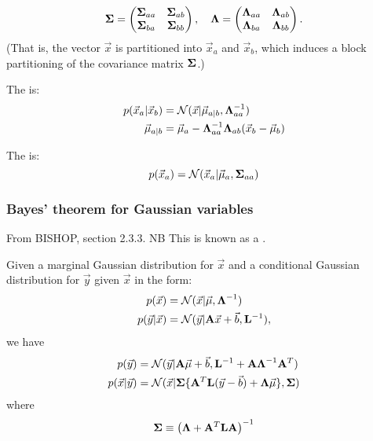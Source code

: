 \documentclass[11pt]{article}
\begin{document}
\begin{appendices}
\begin{equation}
  \boldsymbol{\Sigma} =
  \left(
    \begin{matrix}
      \boldsymbol{\Sigma}_{aa} & \boldsymbol{\Sigma}_{ab} \\
      \boldsymbol{\Sigma}_{ba} & \boldsymbol{\Sigma}_{bb}
    \end{matrix}
  \right)
  , \quad
  \boldsymbol{\Lambda} =
  \left(
    \begin{matrix}
      \boldsymbol{\Lambda}_{aa} & \boldsymbol{\Lambda}_{ab} \\
      \boldsymbol{\Lambda}_{ba} & \boldsymbol{\Lambda}_{bb}
    \end{matrix}
  \right).
\end{equation}
(That is, the vector $\vec{x}$ is partitioned into $\vec{x}_a$ and $\vec{x}_b$, which
induces a block partitioning of the covariance matrix $\boldsymbol{\Sigma}$.)

The  is:
\begin{align}
  p(\vec{x}_a | \vec{x}_b) &= \mathcal{N}(\vec{x} | \vec{\mu}_{a | b},
                              \boldsymbol{\Lambda}_{aa}^{-1}) \\ 
  \vec{\mu}_{a | b}        &= \vec{\mu}_a - \boldsymbol{\Lambda}_{aa}^{-1} \boldsymbol{\Lambda}_{ab}
                              (\vec{x}_b - \vec{\mu}_b) 
\end{align}

The  is:
\begin{equation}
  p(\vec{x}_a) = \mathcal{N}(\vec{x}_a | \vec{\mu}_a, \boldsymbol{\Sigma}_{aa})
\end{equation}

\subsubsection{Bayes' theorem for Gaussian variables}
From BISHOP, section 2.3.3. NB This is known as a .

Given a marginal Gaussian distribution for $\vec{x}$ and a conditional Gaussian
distribution for $\vec{y}$ given $\vec{x}$ in the form:
\begin{align}
  p(\vec{x})         &= \mathcal{N}(\vec{x} | \vec{\mu}, \boldsymbol{\Lambda}^{-1}) \\
  p(\vec{y}|\vec{x}) &= \mathcal{N}(\vec{y} | \mathbf{A} \vec{x} + \vec{b}, \mathbf{L}^{-1}),
\end{align}
we have
\begin{align}
  p(\vec{y})         &= \mathcal{N} (\vec{y} |\mathbf{A} \vec{\mu} + \vec{b}, \mathbf{L}^{-1}
                        + \mathbf{A} \boldsymbol{\Lambda}^{-1} \mathbf{A}^T ) \\
  p(\vec{x}|\vec{y}) &= \mathcal{N} ( \vec{x} | \boldsymbol{\Sigma} \{ \mathbf{A}^T \mathbf{L}
                        (\vec{y} - \vec{b}) + \boldsymbol{\Lambda} \vec{\mu} \}, \boldsymbol{\Sigma})
\end{align}
where
\begin{equation}
  \boldsymbol{\Sigma} \equiv \left(\boldsymbol{\Lambda} + \mathbf{A}^T \mathbf{L} \mathbf{A} \right)^{-1}
\end{equation}



\end{appendices}
\end{document}
